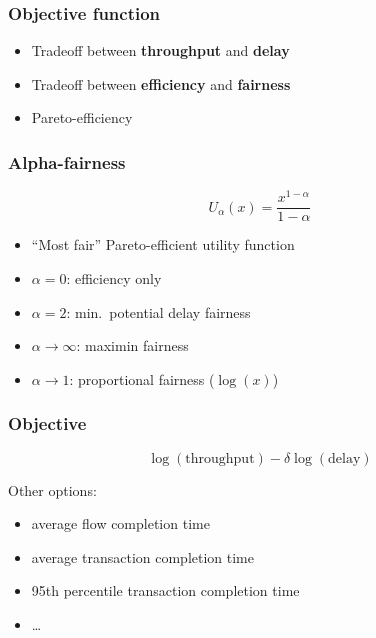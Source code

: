 \documentclass[svgnames]{beamer}
\begin{document}
\begin{frame}
\frametitle{Objective function}

\begin{itemize}

\item Tradeoff between \textbf{throughput} and \textbf{delay}

\item Tradeoff between \textbf{efficiency} and \textbf{fairness}

\item Pareto-efficiency

\end{itemize}

\end{frame}

\begin{frame}
\frametitle{Alpha-fairness}

$$U_{\alpha}(x) = \frac{x^{1-\alpha}}{1-\alpha}$$

\begin{itemize}

\item ``Most fair'' Pareto-efficient utility function

\item $\alpha = 0$: efficiency only

\item $\alpha = 2$: min.~potential delay fairness

\item $\alpha \rightarrow \infty$: maximin fairness

\item $\alpha \rightarrow 1$: proportional fairness ($\log(x)$)

\end{itemize}

\end{frame}

\begin{frame}
\frametitle{Objective}

$$\log(\textrm{throughput}) - \delta \log(\textrm{delay})$$

Other options:

\begin{itemize}

\item average flow completion time

\item average transaction completion time

\item 95th percentile transaction completion time

\item \ldots

\end{itemize}

\end{frame}
\end{document}
